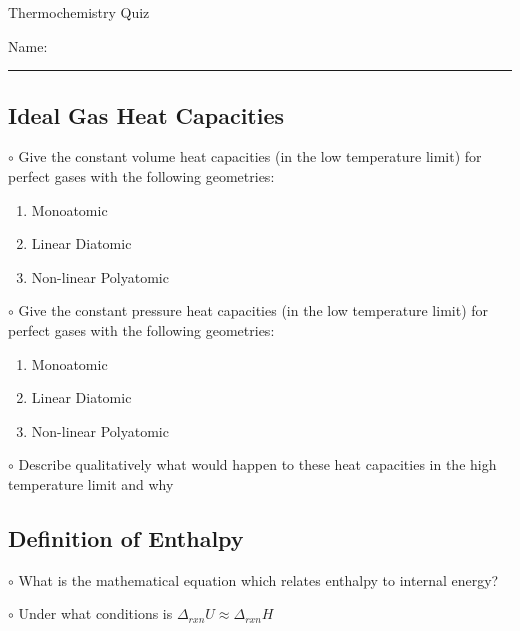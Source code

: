\documentclass[12pt, openany, letterpaper]{memoir}
\begin{document}
\begin{center}
	{\large Thermochemistry Quiz}
	
	
\end{center}

Name: \rule[-.1mm]{15em}{0.1pt}

\subsection*{Ideal Gas Heat Capacities}
$\circ$ Give the constant volume heat capacities (in the low temperature limit) for perfect gases with the following geometries:
\begin{enumerate}
	\item Monoatomic
	
	\vspace{1em}
	\item Linear Diatomic
	
	\vspace{1em}
	\item Non-linear Polyatomic	
\end{enumerate}

\vspace{1em}
\noindent$\circ$ Give the constant pressure heat capacities (in the low temperature limit) for perfect gases with the following geometries:
\begin{enumerate}
	\item Monoatomic
	
	\vspace{1em}
	\item Linear Diatomic
	
	\vspace{1em}
	\item Non-linear Polyatomic	
\end{enumerate}

\vspace{1em}
\noindent$\circ$ Describe qualitatively what would happen to these heat capacities in the high temperature limit and why

\vspace{2em}
\subsection*{Definition of Enthalpy}
$\circ$ What is the mathematical equation which relates enthalpy to internal energy?

\vspace{3em}
\noindent$\circ$ Under what conditions is $\Delta_{rxn}U\approx \Delta_{rxn}H$
\end{document}
